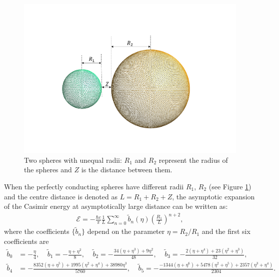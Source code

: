 \begin{figure}[H]
    \hspace*{2cm}\includegraphics[scale = 0.6]{figures/Grid_two_spheres_unequal_radii.png}
    \caption{Two spheres with unequal radii: $R_{1}$ and $R_{2}$ represent the radius of the spheres and $Z$ is the distance between them.}
    \label{Two spheres with unequal radii}
\end{figure}

When the perfectly conducting spheres have different radii $R_{1}$, $R_{2}$ (see Figure \ref{Two spheres with unequal radii}) and the centre distance is denoted as
$L = R_{1} + R_{2} + Z$, the asymptotic expansion of the Casimir energy at asymptotically large distance can be written as:
\begin{align}\label{Asymptotic unequal radii}
    \mathcal{E} = -\frac{\hbar c}{\pi}\frac{1}{L}\sum_{n=0}^{\infty}\tilde{b}_{n}(\eta)\left(\frac{R_{1}}{L}\right)^{n+2},
\end{align}
where the coefficients $\{\tilde{b}_{n}\}$ depend on the parameter $\eta = R_{2}/R_{1}$ and the first six coefficients are
\begin{align*}
    \tilde{b}_{0} &= -\frac{\eta}{4}, \ \ \ \ \ \tilde{b}_{1} = -\frac{\eta + \eta^{2}}{8}, \ \ \ \ \  \tilde{b}_{2} = -\frac{34(\eta+\eta^{3})+ 9\eta^{2}}{48}, \ \ \ \ \ \tilde{b}_{3} = -\frac{2(\eta+\eta^{4}) + 23(\eta^{2} + \eta^{3})}{32}, \\ 
    \tilde{b}_{4} &= -\frac{8352(\eta + \eta^{5})+ 1995(\eta^{2} + \eta^{4}) + 38980\eta^{3}}{5760}, \ \ \ \ \ \tilde{b}_{5} = -\frac{-1344(\eta+\eta^{6}) + 5478(\eta^{2} + \eta^{5})+2357(\eta^{3} + \eta^{4})}{2304}.
\end{align*}

